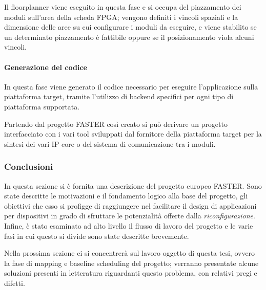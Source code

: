 Il floorplanner viene eseguito in questa fase e si occupa del piazzamento dei 
moduli sull'area della scheda \ac{FPGA}; vengono definiti i vincoli spaziali e 
la dimensione delle aree su cui configurare i moduli da eseguire, e viene 
stabilito se un determinato piazzamento è fattibile oppure se il posizionamento
viola alcuni vincoli.

\paragraph{Generazione del codice} %
In questa fase viene generato il codice necessario per eseguire l'applicazione 
sulla piattaforma target, tramite l'utilizzo di backend specifici per ogni tipo 
di piattaforma supportata.

Partendo dal progetto \ac{FASTER} così creato si può derivare un progetto 
interfacciato con i vari tool sviluppati dal fornitore della piattaforma target 
per la sintesi dei vari IP core o del sistema di comunicazione tra i moduli.


\subsubsection{Conclusioni}
In questa sezione si è fornita una descrizione del progetto europeo 
\ac{FASTER}. Sono state descritte le motivazioni e il fondamento logico alla 
base del progetto, gli obiettivi che esso si profigge di raggiungere nel 
facilitare il design di applicazioni per dispositivi in grado di sfruttare le 
potenzialità offerte dalla \emph{riconfigurazione}. Infine, è stato esaminato 
ad alto livello il flusso di lavoro del progetto e le varie fasi in cui questo 
si divide sono state descritte brevemente.

Nella prossima sezione ci si concentrerà sul lavoro oggetto di questa tesi, 
ovvero la fase di mapping e baseline scheduling del progetto; verranno presentate alcune 
soluzioni presenti in letteratura riguardanti questo problema, con 
relativi pregi e difetti.
